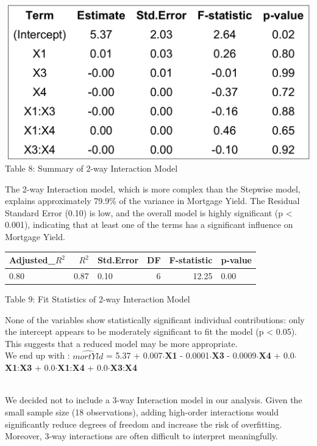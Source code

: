 \documentclass[
  12pt,
]{article}
\begin{document}
\begin{minipage}{0.5\textwidth}
\includegraphics[width=1.25\linewidth]{figures/interaction_model_coef.png}
\vspace{-0.3em}
\fontsize{12}{12}\selectfont Table 8: Summary of 2-way Interaction Model
\end{minipage}
\hfill
\begin{minipage}{0.35\textwidth}
The 2-way Interaction model, which is more complex than the Stepwise
model, explains approximately 79.9\% of the variance in Mortgage Yield.
The Residual Standard Error (0.10) is low, and the overall model is
highly significant (p < 0.001), indicating that at least one of the
terms has a significant influence on Mortgage Yield.
\end{minipage}

\begin{table}[!h]
\centering\begingroup\fontsize{8}{10}\selectfont

\begin{tabular}{lrlrrl}
\toprule
Adjusted\_$R^{2}$ & $R^2$ & Std.Error & DF & F-statistic & p-value\\
\midrule
0.80 & 0.87 & 0.10 & 6 & 12.25 & 0.00\\
\bottomrule
\end{tabular}
\endgroup{}
\end{table}
\begin{center}
\vspace{-1.5em}
{\fontsize{12}{14}\selectfont Table 9: Fit Statistics of 2-way Interaction Model\par}
\end{center}

\addtocounter{table}{2}

None of the variables show statistically significant individual
contributions: only the intercept appears to be moderately significant
to fit the model (p \textless{} 0.05). This suggests that a reduced
model may be more appropriate.\\
We end up with : \(\hat{mortYld}\) = 5.37 + 0.007\(\cdot\)\textbf{X1} -
0.0001\(\cdot\)\textbf{X3} - 0.0009\(\cdot\)\textbf{X4} +
0.0\(\cdot\)\textbf{X1}:\textbf{X3} +
0.0\(\cdot\)\textbf{X1}:\textbf{X4} +
0.0\(\cdot\)\textbf{X3}:\textbf{X4}\\
\strut \\
We decided not to include a 3-way Interaction model in our analysis.
Given the small sample size (18 observations), adding high-order
interactions would significantly reduce degrees of freedom and increase
the risk of overfitting. Moreover, 3-way interactions are often
difficult to interpret meaningfully.
\end{document}
